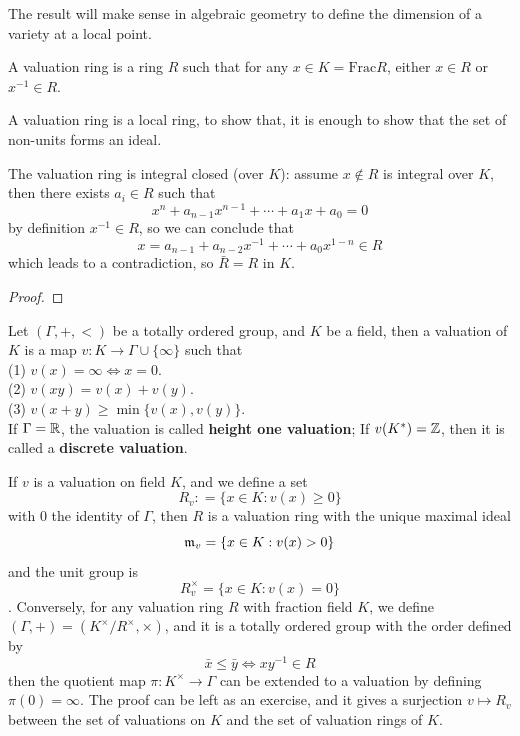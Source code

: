 \begin{remark}
    The result will make sense in algebraic geometry to define the dimension of a variety at a local point.
\end{remark}


\begin{definition}
    A valuation ring is a ring \(R\) such that for any \(x \in K = \mathrm{Frac}R\), either \(x \in R\) or \(x^{-1} \in R\).
\end{definition}

\begin{remark}
    A valuation ring is a local ring, to show that, it is enough to show that the set of non-units forms an ideal.
\end{remark}

\begin{remark}
    The valuation ring is integral closed (over \(K\)): assume \(x \notin R\) is integral over \(K\), then there exists \(a_i \in R\) such that
    \[x^n + a_{n-1}x^{n-1} + \cdots + a_1x + a_0  = 0\]
    by definition \(x ^{-1} \in R\), so we can conclude that
    \[x = a_{n-1} + a_{n-2}x^{-1} + \cdots + a_0 x^{1-n} \in R\]
    which leads to a contradiction, so \(\bar{R} = R\) in \(K\).
\end{remark}




\begin{proof}
    
\end{proof}

\begin{definition}
    Let \((\Gamma,+,<)\) be a totally ordered group, and \(K\) be a field, then a valuation of \(K\) is a map \(v: K \to \Gamma \cup \{\infty\}\) such that\\
    (1) \(v(x) = \infty \iff x = 0\).\\
    (2) \(v(xy) = v(x) + v(y)\).\\
    (3) \(v(x+y) \geq \min\{v(x),v(y)\}\).\\
    If \(\Gamma = \mathbb{R}\), the valuation is called \textbf{height one valuation}; If \(v(K^*) = \mathbb{Z}\), then it is called a \textbf{discrete valuation}.
\end{definition}

\begin{remark}
    If \(v\) is a valuation on field \(K\), and we define a set
    \[R_v : = \{x \in K : v(x) \geq 0\}\]
    with \(0\) the identity of \(\Gamma\), then \(R\) is a valuation ring with the unique maximal ideal
    \[\mathfrak{m}_v  = \{x \in K: v(x) > 0\}\]
    and the unit group is \[R_v^\times = \{x \in K: v(x) = 0\}\].
    Conversely, for any valuation ring \(R\) with fraction field \(K\), we define \((\Gamma,+) = (K^\times/R^\times, \times)\), and it is a totally ordered group with the order defined by
    \[\bar{x} \leq \bar{y} \iff xy^{-1} \in R\]
    then the quotient map \(\pi: K^\times \to \Gamma\) can be extended to a valuation by defining \(\pi(0) = \infty\). The proof can be left as an exercise, and it gives a surjection \(v \mapsto R_v\) between the set of valuations on \(K\) and the set of valuation rings of \(K\).

\end{remark}

